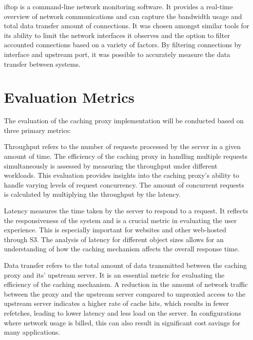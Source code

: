 iftop\cite{iftop} is a command-line network monitoring software. It provides a real-time overview of network communications and can capture the bandwidth usage and total data transfer amount of connections. It was chosen amongst similar tools for its ability to limit the network interfaces it observes and the option to filter accounted connections based on a variety of factors. By filtering connections by interface and upstream port, it was possible to accurately measure the data transfer between systems.


\section{Evaluation Metrics}

The evaluation of the caching proxy implementation will be conducted based on three primary metrics:

\begin{description}[style=nextline]
\item[Throughput] Throughput refers to the number of requests processed by the server in a given amount of time. The efficiency of the caching proxy in handling multiple requests simultaneously is assessed by measuring the throughput under different workloads. This evaluation provides insights into the caching proxy's ability to handle varying levels of request concurrency. The amount of concurrent requests is calculated by multiplying the throughput by the latency.

\item[Latency] Latency measures the time taken by the server to respond to a request. It reflects the responsiveness of the system and is a crucial metric in evaluating the user experience. This is especially important for websites and other web-hosted through S3. The analysis of latency for different object sizes allows for an understanding of how the caching mechanism affects the overall response time.

\item[Data transfer] Data transfer refers to the total amount of data transmitted between the caching proxy and its' upstream server. It is an essential metric for evaluating the efficiency of the caching mechanism. A reduction in the amount of network traffic between the proxy and the upstream server compared to unproxied access to the upstream server indicates a higher rate of cache hits, which results in fewer refetches, leading to lower latency and less load on the server. In configurations where network usage is billed, this can also result in significant cost savings for many applications.

\end{description}

